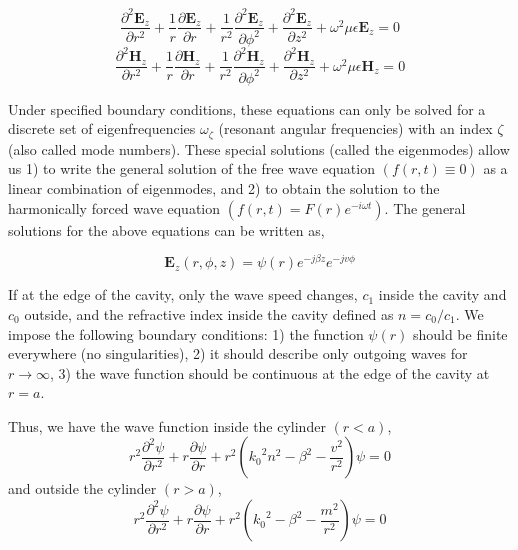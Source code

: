 \begin{equation}
  \frac{{\partial}^2\bm{E}_z}{\partial{r^2}} +\frac{1}{r}\frac{\partial\bm{E}_z}{\partial{r}} +\frac{1}{r^2}\frac{{\partial}^2\bm{E}_z}{\partial{{\phi}^2}} + \frac{{\partial}^2\bm{E}_z}{\partial{z^2}} +{\omega}^2\mu\epsilon\bm{E}_z = 0
\end{equation}
\begin{equation}
  \frac{{\partial}^2\bm{H}_z}{\partial{r^2}} +\frac{1}{r}\frac{\partial\bm{H}_z}{\partial{r}} +\frac{1}{r^2}\frac{{\partial}^2\bm{H}_z}{\partial{{\phi}^2}} + \frac{{\partial}^2\bm{H}_z}{\partial{z^2}} +{\omega}^2\mu\epsilon\bm{H}_z = 0
\end{equation}

Under specified boundary conditions, these equations can only be solved for a
discrete set of eigenfrequencies $\omega_\zeta$ (resonant angular frequencies)
with an index $\zeta$ (also called mode numbers). These special solutions
(called the eigenmodes) allow us 1) to write the general solution of the free
wave equation $(f(r,t)\equiv0)$ as a linear combination of eigenmodes, and 2)
to obtain the solution to the harmonically forced wave equation $(f(r,t) =
F(r)e^{-i\omega{t}})$. The general solutions for the above equations can be
written as,

\begin{equation}
  \bm{E}_z(r,\phi,z)=\psi(r)e^{-j\beta{z}}e^{-jv\phi}
\end{equation}

If at the edge of the cavity, only the wave speed changes, $c_1$ inside the
cavity and $c_0$ outside, and the refractive index inside the cavity defined as
$n=c_0/c_1$. We impose the following boundary conditions: 1) the function
$\psi(r)$ should be finite everywhere (no singularities), 2) it should describe
only outgoing waves for $r\rightarrow\infty$, 3) the wave function should be
continuous at the edge of the cavity at $r=a$.

Thus, we have the wave function inside the cylinder $(r<a)$,
\begin{equation}
  {r^2}\frac{{\partial}^2\psi}{\partial{r^2}}+r\frac{\partial\psi}{\partial{r}}+r^2({k_0}^2n^2-\beta^2-\frac{v^2}{r^2})\psi = 0
\end{equation}
and outside the cylinder $(r>a)$,
\begin{equation}
  {r^2}\frac{{\partial}^2\psi}{\partial{r^2}}+r\frac{\partial\psi}{\partial{r}}+r^2({k_0}^2-\beta^2-\frac{m^2}{r^2})\psi = 0
\end{equation}

